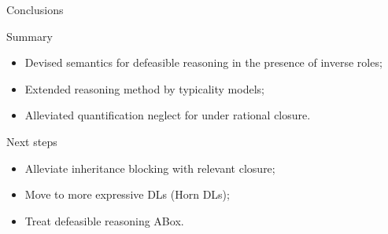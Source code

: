 \documentclass[10pt]{beamer}
\begin{document}
%
%

\begin{frame}[fragile] {Conclusions}

\large{
Summary

\begin{itemize}
  \item Devised semantics for defeasible reasoning in the presence of inverse roles;
  \item Extended reasoning method by typicality models;
  \item Alleviated quantification neglect for \ELIbot under rational closure.
\end{itemize}

Next steps

\begin{itemize}
  \item Alleviate inheritance blocking with relevant closure;
  \item Move to more expressive DLs (Horn DLs);
  \item Treat defeasible reasoning \wrt ABox.
\end{itemize}
}
\end{frame}





%
%

%  
%  
\end{document}
